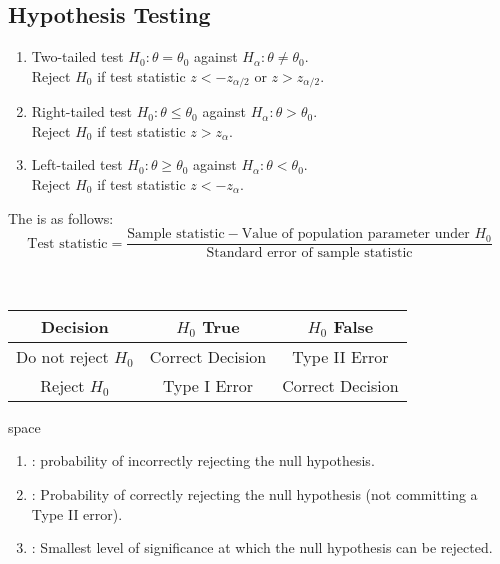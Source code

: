 \subsection{Hypothesis Testing}

\begin{definition} 
\begin{enumerate}[label=\roman*.]
\setlength{\itemsep}{0pt}
\item Two-tailed test $H_0: \theta = \theta_0$ against $H_{\alpha} : \theta \neq \theta_0$.\\
Reject $H_0$ if test statistic $z < - z_{\alpha/2}$ or $z > z_{\alpha/2}$.
\item Right-tailed test $H_0: \theta \leq \theta_0$ against $H_{\alpha} : \theta > \theta_0$.\\
Reject $H_0$ if test statistic $z > z_{\alpha}$.
\item Left-tailed test $H_0: \theta \geq \theta_0$ against $H_{\alpha} : \theta < \theta_0$.\\
Reject $H_0$ if test statistic $z < - z_{\alpha}$.
\end{enumerate}
\end{definition}

\begin{definition}
The  is as follows:
\begin{equation}
\text{Test statistic} = \frac{\text{Sample statistic} - \text{Value of population parameter under } H_0}{\text{Standard error of sample statistic}} \nonumber
\end{equation}
\end{definition}

\begin{definition} \\

\begin{tabular}{|c|c|c|}
\hline
\rowcolor{gray!30}
Decision & $H_0$ True & $H_0$ False \\
\hline
Do not reject $H_0$ & Correct Decision & Type II Error \\
\hline
Reject $H_0$ & Type I Error & Correct Decision \\
\hline
\end{tabular}
\end{definition}

\hfill

\begin{definition} {\color{white}space}
\begin{enumerate}[label=\roman*.]
\setlength{\itemsep}{0pt}
\item {}: probability of incorrectly rejecting the null hypothesis.
\item {}: Probability of correctly rejecting the null hypothesis (not committing a Type II error).
\item {}: Smallest level of significance at which the null hypothesis can be rejected.
\end{enumerate}
\end{definition}

